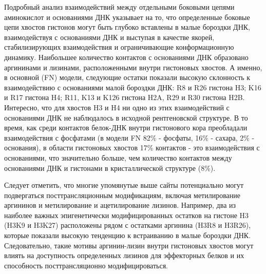     Подробный анализ взаимодействий между отдельными боковыми цепями аминокислот и основаниями ДНК указывает на то, что определенные боковые цепи хвостов гистонов могут быть глубоко вставлены в малые бороздки ДНК, взаимодействуя с основаниями ДНК и выступая в качестве якорей, стабилизирующих взаимодействия и ограничивающие конформационную динамику. Наибольшее количество контактов с основаниями ДНК образовано аргининами и лизинами, расположенными внутри гистоновых хвостов. А именно, в основной (FN) модели, следующие остатки показали высокую склонность к взаимодействию с основаниями малой бороздки ДНК: R8 и R26 гистона H3; K16 и R17 гистона H4; R11, K13 и K126 гистона H2A, R29 и R30 гистона H2B. Интересно, что для хвостов H3 и H4 ни одно из этих взаимодействий с основаниями ДНК не наблюдалось в исходной рентгеновской структуре. В то время, как среди контактов белок-ДНК внутри гистонового кора преобладали взаимодействия с фосфатами (в модели FN 82\% - фосфаты, 16\% - сахара, 2\% - основания), в области гистоновых хвостов 17\% контактов - это взаимодействия с основаниями, что значительно больше, чем  количество контактов между основаниями ДНК и гистонами в кристаллической структуре (8\%).

    Следует отметить, что многие упомянутые выше сайты потенциально могут подвергаться посттрансляционным модификациям, включая метилирование аргининов и метилирование и ацетилирование лизинов. Например, два из наиболее важных эпигенетически модифицированных остатков на гистоне H3 (H3K9 и H3K27) расположены рядом с остатками аргинина (H3R8 и H3R26), которые показали высокую тенденцию к встраиванию в малые бороздки ДНК. Следовательно, такие мотивы аргинин-лизин внутри гистоновых хвостов могут влиять на доступность определенных лизинов для эффекторных белков и их способность посттрансляционно модифицироваться.
    
